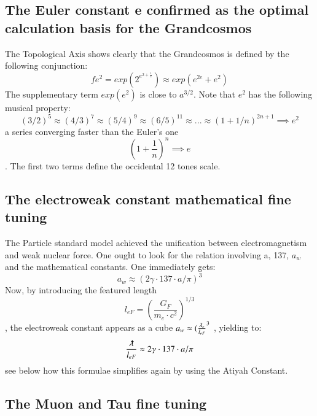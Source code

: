 \documentclass[twoside,draft]{article}
\begin{document}
{\subsection {The Euler constant e confirmed as the optimal calculation basis for the Grandcosmos}

The Topological Axis shows clearly that the Grandcosmos is defined by the following
conjunction:
\begin{equation}
f{e^{2}} = exp(2^{e^{2+\frac{1}{2}}}) \approx exp(e^{2e}+e^{2})
\end{equation}
The supplementary term $exp(e^{2})$ is close to $a^{3/2}$. Note that $e^{2}$ has the following musical property:
\begin{equation}
(3/2)^{5} \approx (4/3)^{7} \approx (5/4)^{9} \approx (6/5)^{11} \approx ... \approx (1+1/n)^{2n+1} \implies e^{2}
\end{equation}
a series converging faster than the Euler's one $$(1+\frac{1}{n})^{n} \implies e$$. The first two terms define
the occidental 12 tones scale.

\subsection {The electroweak constant mathematical fine tuning}

The Particle standard model achieved the unification between electromagnetism and weak
nuclear force. One ought to look for the relation involving a, 137, $a_{w}$ and the mathematical constants. One
immediately gets:
\begin{equation}
a_{w} \approx (2\gamma \cdot 137 \cdot a/\pi)^{3}
\end{equation}
Now, by introducing the featured length $$l_{eF} = (\frac{G_{F}}{m_{e} \cdot c^{2}})^{1/3}$$ , the electroweak constant appears as
a cube $a_{w} \approx (\frac{\lambdabar_{e}}{l_{eF}}^{3}$ , yielding to:
\begin{equation}
\frac{\lambdabar}{l_{eF}} \approx 2\gamma \cdot 137 \cdot a/\pi
\end{equation}
see below how this formulae simplifies again by using the Atiyah Constant.

\subsection {The Muon and Tau fine tuning}

}
\end{document}
